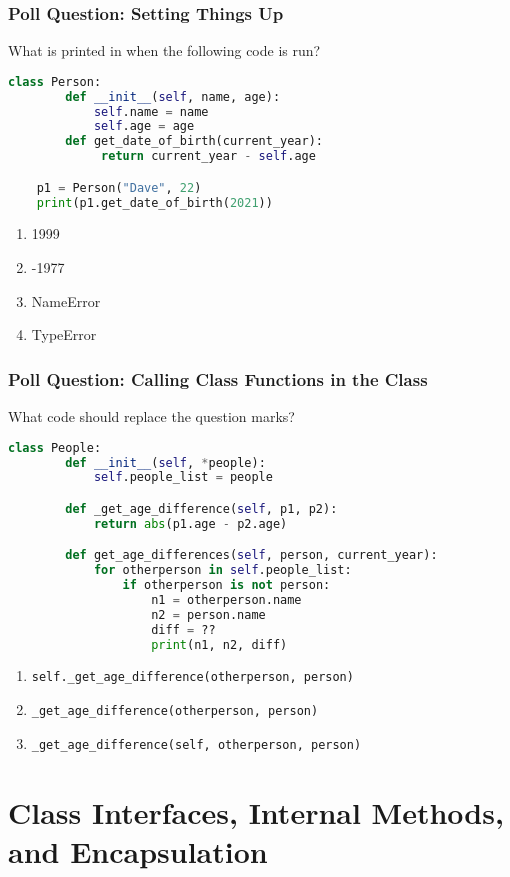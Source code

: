 \documentclass{beamer}
\begin{document}
%
%
\begin{frame}[fragile]
    \frametitle{Poll Question: Setting Things Up}
    What is printed in when the following code is run?
    \begin{lstlisting}[language=Python, autogobble]
    class Person:
        def __init__(self, name, age):
            self.name = name
            self.age = age
        def get_date_of_birth(current_year):
             return current_year - self.age

    p1 = Person("Dave", 22)
    print(p1.get_date_of_birth(2021))
    \end{lstlisting}
    \vfill
    \begin{enumerate}[A]
        \item 1999
        \item -1977
        \item NameError
        \item TypeError
    \end{enumerate}
\end{frame}

%
%
\begin{frame}[fragile]
    \frametitle{Poll Question: Calling Class Functions in the Class}
    What code should replace the question marks?
    \begin{lstlisting}[language=Python, basicstyle=\tiny]
class People:
		def __init__(self, *people):
			self.people_list = people

		def _get_age_difference(self, p1, p2):
			return abs(p1.age - p2.age)

		def get_age_differences(self, person, current_year):
			for otherperson in self.people_list:
				if otherperson is not person:
					n1 = otherperson.name
					n2 = person.name
					diff = ??
					print(n1, n2, diff)
	\end{lstlisting}
    \vfill
    \begin{enumerate}[A]
        \item \lstinline|self._get_age_difference(otherperson, person)|
        \item \lstinline|_get_age_difference(otherperson, person)|
        \item \lstinline|_get_age_difference(self, otherperson, person)|
    \end{enumerate}
\end{frame}


\section{Class Interfaces, Internal Methods, and Encapsulation}
\end{document}
